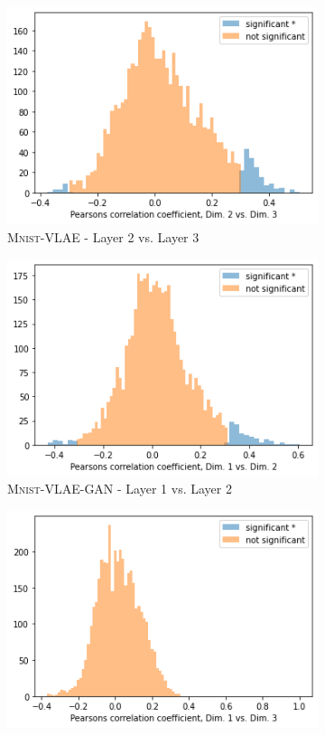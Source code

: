 \begin{figure}
\begin{subfigure}{.3\textwidth}
        \includegraphics[width=\textwidth]{images/notprop/dsprites/vlae/dim_2_3.png}
        \caption{\textsc{Mnist}-\ac{VLAE} - Layer 2 vs. Layer 3}
    \end{subfigure}
    \begin{subfigure}{.3\textwidth}
        \includegraphics[width=\textwidth]{images/notprop/dsprites/vlae_gan/dim_1_2.png}
        \caption{\textsc{Mnist}-\ac{VLAE}-\ac{GAN} - Layer 1 vs. Layer 2}
    \end{subfigure}
    \hfill
    \begin{subfigure}{.3\textwidth}
        \includegraphics[width=\textwidth]{images/notprop/dsprites/vlae_gan/dim_1_3.png}

\end{subfigure}
\end{figure}
